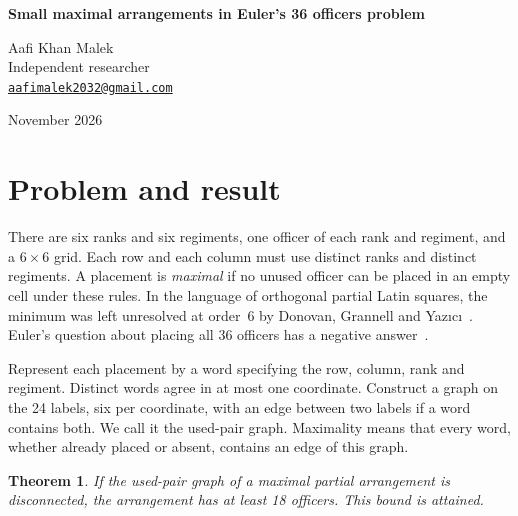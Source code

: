 \documentclass[11pt]{article}
\newtheorem{theorem}{Theorem}
\begin{document}
\begin{center}
{\Large\bfseries Small maximal arrangements in Euler's 36 officers problem\par}
\medskip
Aafi Khan Malek\\
Independent researcher\\
\href{mailto:aafimalek2032@gmail.com}{\texttt{aafimalek2032@gmail.com}}\par
{} November 2026
\end{center}

\begin{abstract}
Euler's classical problem asks for an arrangement of all 36 officers
and has a negative answer. We consider the fewest officers needed
to make a partial arrangement maximal. We prove that the minimum is
18 among arrangements whose graph of used pairs is disconnected.
Any smaller maximal arrangement must therefore be connected. We also exclude all maximal arrangements of 14 or 15 officers, so the unrestricted minimum lies between 16 and 18. These results use independently checked SAT certificates.
\end{abstract}

\section{Problem and result}

There are six ranks and six regiments, one officer of each rank
and regiment, and a \(6\times 6\) grid. Each row and each column
must use distinct ranks and distinct regiments. A placement is
\emph{maximal} if no unused officer can be placed in an empty
cell under these rules. In the language of orthogonal partial
Latin squares, the minimum was left unresolved at order~6
by Donovan, Grannell and Yaz\i c\i~\cite[Table~1]{dgy}.
Euler's question about placing all 36 officers has a negative
answer~\cite{euler}.

Represent each placement by a word specifying the row, column,
rank and regiment. Distinct words agree in at most one coordinate.
Construct a graph on the 24 labels, six per coordinate, with
an edge between two labels if a word contains both. We call it
the used-pair graph. Maximality means that every word, whether
already placed or absent, contains an edge of this graph.

\begin{theorem}
If the used-pair graph of a maximal partial arrangement is
disconnected, the arrangement has at least 18 officers. This
bound is attained.
\end{theorem}
\end{document}
